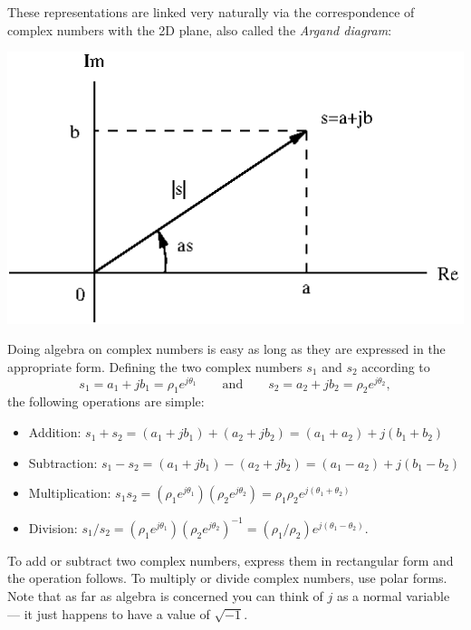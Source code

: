 \documentclass[10pt]{beamer}
\begin{document}
These representations are linked very naturally via the correspondence of complex numbers with the 2D plane, also called the {\em Argand diagram}:
\begin{center}
  \includegraphics{complexnumberplane}
\end{center}

Doing algebra on complex numbers is easy as long as they are expressed in the appropriate form.  Defining the two complex numbers $s_1$ and $s_2$ according to
\begin{equation*}
  s_1 = a_1 + j b_1 = \rho_1 e^{j \theta_1} \qquad \text{and} \qquad 
  s_2 = a_2 + j b_2 = \rho_2 e^{j \theta_2},
\end{equation*}
the following operations are simple:
\begin{itemize}
\item Addition:  $s_1 + s_2 = (a_1 + j b_1) + (a_2 + j b_2) = (a_1 + a_2) + j (b_1 + b_2)$
\item Subtraction:  $s_1 - s_2 = (a_1 + j b_1) - (a_2 + j b_2) = (a_1 - a_2) + j (b_1 - b_2)$
\item Multiplication:  $s_1 s_2 = (\rho_1 e^{j \theta_1}) (\rho_2 e^{j \theta_2}) = \rho_1 \rho_2 e^{j (\theta_1 + \theta_2)}$
\item Division:  $s_1/s_2 = (\rho_1 e^{j \theta_1}) (\rho_2 e^{j \theta_2})^{-1} = (\rho_1/\rho_2) e^{j (\theta_1 - \theta_2)}$.
\end{itemize}
To add or subtract two complex numbers, express them in rectangular form and the operation follows.  To multiply or divide complex numbers, use polar forms.  Note that as far as algebra is concerned you can think of $j$ as a normal variable --- it just happens to have a value of $\sqrt{-1}$.
\end{document}
